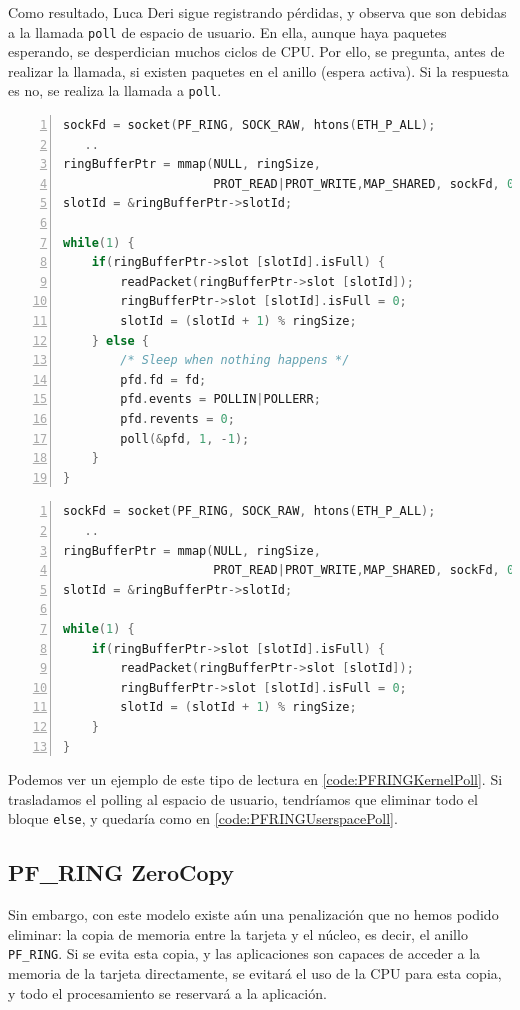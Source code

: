 Como resultado, Luca Deri sigue registrando pérdidas, y observa que son debidas a la llamada \texttt{poll} de espacio 
de usuario. En ella, aunque haya paquetes esperando, se desperdician muchos ciclos de CPU. Por ello, se pregunta, antes 
de realizar la llamada, si existen paquetes en el anillo (espera activa). Si la respuesta es no, se realiza la llamada 
a \texttt{poll}.

\begin{lstlisting}[language=C++,caption={Lectura de paquetes con poll en el núcleo}, 
breaklines=true, label=code:PFRINGKernelPoll,numbers=left,float=htbp]
sockFd = socket(PF_RING, SOCK_RAW, htons(ETH_P_ALL);
   ..
ringBufferPtr = mmap(NULL, ringSize,
                     PROT_READ|PROT_WRITE,MAP_SHARED, sockFd, 0);
slotId = &ringBufferPtr->slotId;

while(1) {
    if(ringBufferPtr->slot [slotId].isFull) {
        readPacket(ringBufferPtr->slot [slotId]);
        ringBufferPtr->slot [slotId].isFull = 0;
        slotId = (slotId + 1) % ringSize;
    } else {
        /* Sleep when nothing happens */
        pfd.fd = fd;
        pfd.events = POLLIN|POLLERR;
        pfd.revents = 0;
        poll(&pfd, 1, -1);
    }
}
\end{lstlisting}

\begin{lstlisting}[language=C++,caption={Lectura de paquetes con poll en el espacio de usuario}, 
breaklines=true, label=code:PFRINGUserspacePoll,numbers=left,float=htbp]
sockFd = socket(PF_RING, SOCK_RAW, htons(ETH_P_ALL);
   ..
ringBufferPtr = mmap(NULL, ringSize,
                     PROT_READ|PROT_WRITE,MAP_SHARED, sockFd, 0);
slotId = &ringBufferPtr->slotId;

while(1) {
    if(ringBufferPtr->slot [slotId].isFull) {
        readPacket(ringBufferPtr->slot [slotId]);
        ringBufferPtr->slot [slotId].isFull = 0;
        slotId = (slotId + 1) % ringSize;
    }
}
\end{lstlisting}

Podemos ver un ejemplo de este tipo de lectura en \lstlistingname{} \ref{code:PFRINGKernelPoll}. Si trasladamos el 
polling al espacio de usuario, tendríamos que eliminar todo el bloque \texttt{else}, y quedaría como en 
\lstlistingname{} \ref{code:PFRINGUserspacePoll}.

\subsection{PF\_RING ZeroCopy}
Sin embargo, con este modelo existe aún una penalización que no hemos podido eliminar: la copia de memoria entre la 
tarjeta y el núcleo, es decir, el anillo \texttt{PF\_RING}. Si se evita esta copia, y las aplicaciones son capaces de 
acceder a la memoria de la tarjeta directamente, se evitará el uso de la CPU para esta copia, y todo el procesamiento 
se reservará a la aplicación.

